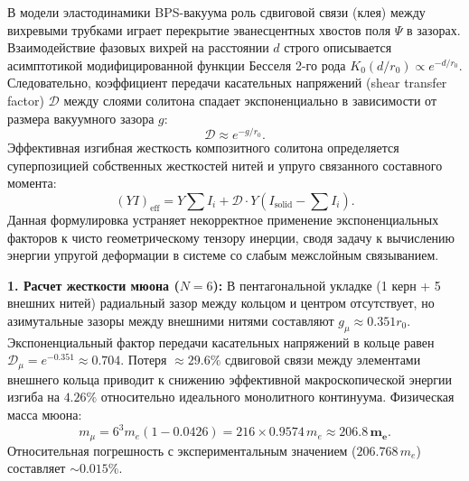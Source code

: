 \documentclass[11pt,a4paper]{article}
\begin{document}
	В модели эластодинамики BPS-вакуума роль сдвиговой связи (клея) между вихревыми трубками играет перекрытие эванесцентных хвостов поля $\Psi$ в зазорах. Взаимодействие фазовых вихрей на расстоянии $d$ строго описывается асимптотикой модифицированной функции Бесселя 2-го рода $K_0(d/r_0) \propto e^{-d/r_0}$. Следовательно, коэффициент передачи касательных напряжений (shear transfer factor) $\mathcal{D}$ между слоями солитона спадает экспоненциально в зависимости от размера вакуумного зазора $g$:
	\begin{equation}
		\mathcal{D} \approx e^{-g/r_0}.
	\end{equation}
	Эффективная изгибная жесткость композитного солитона определяется суперпозицией собственных жесткостей нитей и упруго связанного составного момента:
	\begin{equation}
		(Y I)_{\text{eff}} = Y \sum I_i + \mathcal{D} \cdot Y \left( I_{\text{solid}} - \sum I_i \right).
	\end{equation}
	Данная формулировка устраняет некорректное применение экспоненциальных факторов к чисто геометрическому тензору инерции, сводя задачу к вычислению энергии упругой деформации в системе со слабым межслойным связыванием.
	
	\textbf{1. Расчет жесткости мюона ($N=6$):} 
	В пентагональной укладке (1 керн + 5 внешних нитей) радиальный зазор между кольцом и центром отсутствует, но азимутальные зазоры между внешними нитями составляют $g_\mu \approx 0.351 r_0$. Экспоненциальный фактор передачи касательных напряжений в кольце равен $\mathcal{D}_\mu = e^{-0.351} \approx 0.704$.
	Потеря $\approx 29.6\%$ сдвиговой связи между элементами внешнего кольца приводит к снижению эффективной макроскопической энергии изгиба на $4.26\%$ относительно идеального монолитного континуума. Физическая масса мюона:
	\begin{equation}
		m_\mu = 6^3 m_e (1 - 0.0426) = 216 \times 0.9574 \, m_e \approx \mathbf{206.8 \, m_e}.
	\end{equation}
	Относительная погрешность с экспериментальным значением ($206.768 \, m_e$) составляет $\sim 0.015\%$.
	
\end{document}

